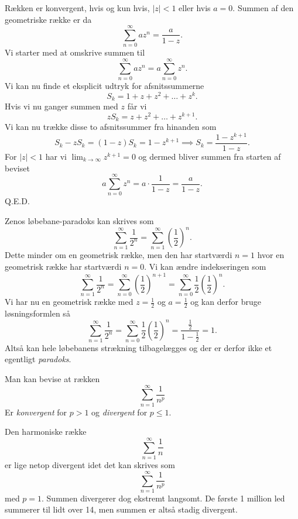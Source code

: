 \begin{sæt} 
  Rækken er konvergent, hvis og kun hvis, $|z| < 1$ eller hvis $a = 0$. Summen af den geometriske række er da
  \[ 
  \sum_{n = 0}^{\infty} a z^{n} = \frac{a}{1-z}
  .\]
  \tcblower
  Vi starter med at omskrive summen til
  \[ 
  \sum_{n = 0}^{\infty} a z^{n}= a \sum_{n = 0}^{\infty} z^{n}
  .\]
  Vi kan nu finde et eksplicit udtryk for afsnitssummerne
  \[
    S_k = 1 + z + z^2 + \ldots + z^{k}
  .\]
  Hvis vi nu ganger summen med $z$ får vi
  \[ 
  zS_k = z + z^2 + \ldots + z^{k+1}
  .\]
  Vi kan nu trække disse to afsnitssummer fra hinanden som
  \[
    S_k - zS_k = (1-z)S_k = 1 - z^{k+1} \implies S_k = \frac{1 - z^{k+1}}{1-z}
  .\]
  For $|z| < 1$ har vi $\lim_{k \to \infty} z^{k+1} = 0$ og dermed bliver summen fra starten af beviset
  \[ 
  a \sum_{n = 0}^{\infty} z^{n} = a \cdot \frac{1}{1-z} = \frac{a}{1-z}
  .\]
  Q.E.D.
\end{sæt}

\begin{eks} 
  Zenos løbebane-paradoks kan skrives som
  \[ 
  \sum_{n = 1}^{\infty} \frac{1}{2^{n}} = \sum_{n = 1}^{\infty} \left( \frac{1}{2} \right)^{n}
  .\]
  Dette minder om en geometrisk række, men den har startværdi $n = 1$ hvor en geometrisk række har startværdi $n = 0$. Vi kan ændre indekseringen som
  \[ 
  \sum_{n = 1}^{\infty} \frac{1}{2^{n}} = \sum_{n = 0}^{\infty} \left( \frac{1}{2} \right)^{n+1} = \sum_{n =0}^{\infty} \frac{1}{2} \left( \frac{1}{2} \right)^{n}
  .\]
  Vi har nu en geometrisk række med $z =\frac{1}{2}$ og $a = \frac{1}{2}$ og kan derfor bruge løsningsformlen så
  \[ 
  \sum_{n = 1}^{\infty} \frac{1}{2^{n}} = \sum_{n = 0}^{\infty} \frac{1}{2} \left( \frac{1}{2} \right)^{n} = \frac{\frac{1}{2}}{1 - \frac{1}{2}} = 1
  .\]
  Altså kan hele løbebanens strækning tilbagelægges og der er derfor ikke et egentligt \textit{paradoks}.
\end{eks}

\begin{sæt}
  Man kan bevise at rækken
  \[ 
  \sum_{n = 1}^{\infty} \frac{1}{n^{p}}
  \]
  Er \textit{konvergent} for $p >1$ og \textit{divergent} for $p \leq 1$.
\end{sæt}

\begin{eks}  \label{afs:harræk}
  Den harmoniske række
  \[ 
  \sum_{n = 1}^{\infty} \frac{1}{n}
  \]
  er lige netop divergent idet det kan skrives som
  \[ 
  \sum_{n =1}^{\infty} \frac{1}{n^{p}}
  \]
  med $p = 1$. Summen divergerer dog ekstremt langsomt. De første 1 million led summerer til lidt over 14, men summen er altså stadig divergent.
\end{eks}

